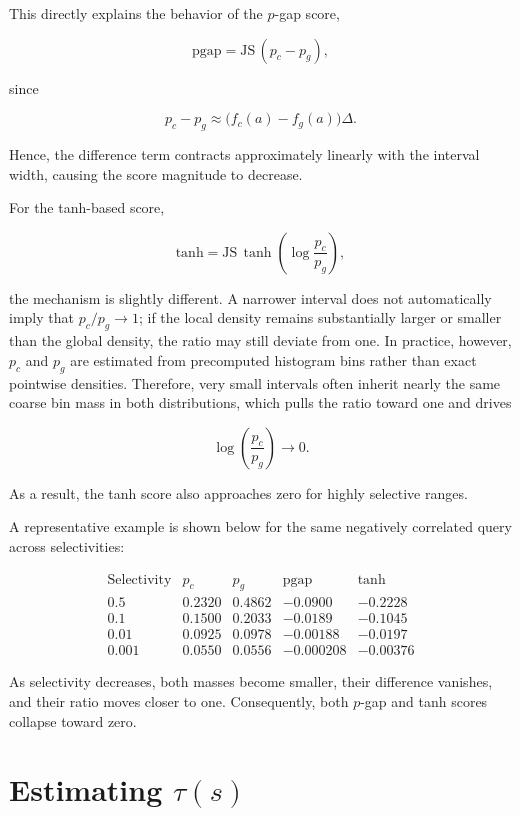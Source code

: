This directly explains the behavior of the \(p\)-gap score,

\[
\mathrm{pgap} = \mathrm{JS}\,(p_c - p_g),
\]

since

\[
p_c - p_g \approx \bigl(f_c(a)-f_g(a)\bigr)\Delta.
\]

Hence, the difference term contracts approximately linearly with the interval width, causing the score magnitude to decrease.

For the tanh-based score,

\[
\mathrm{tanh} = \mathrm{JS}\,\tanh\!\left(\log\frac{p_c}{p_g}\right),
\]

the mechanism is slightly different. A narrower interval does not automatically imply that \(p_c/p_g \to 1\); if the local density remains substantially larger or smaller than the global density, the ratio may still deviate from one. In practice, however, \(p_c\) and \(p_g\) are estimated from precomputed histogram bins rather than exact pointwise densities. Therefore, very small intervals often inherit nearly the same coarse bin mass in both distributions, which pulls the ratio toward one and drives

\[
\log\!\left(\frac{p_c}{p_g}\right) \to 0.
\]

As a result, the tanh score also approaches zero for highly selective ranges.

A representative example is shown below for the same negatively correlated query across selectivities:

\[
\begin{array}{c|c|c|c|c}
\text{Selectivity} & p_c & p_g & \text{pgap} & \text{tanh} \\
\hline
0.5   & 0.2320 & 0.4862 & -0.0900   & -0.2228 \\
0.1   & 0.1500 & 0.2033 & -0.0189   & -0.1045 \\
0.01  & 0.0925 & 0.0978 & -0.00188  & -0.0197 \\
0.001 & 0.0550 & 0.0556 & -0.000208 & -0.00376
\end{array}
\]

As selectivity decreases, both masses become smaller, their difference vanishes, and their ratio moves closer to one. Consequently, both \(p\)-gap and tanh scores collapse toward zero.
\section{Estimating \texorpdfstring{$\tau(s)$}{tau(s)}}
\label{sec:tau-estimation}

